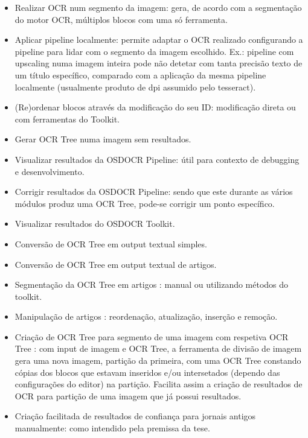 \begin{itemize}
	\item Realizar OCR num segmento da imagem: gera, de acordo com a segmentação do motor OCR, múltiplos blocos com uma só ferramenta.
	
	\item Aplicar pipeline localmente: permite adaptar o OCR realizado configurando a pipeline para lidar com o segmento da imagem escolhido. Ex.: pipeline com upscaling numa imagem inteira pode não detetar com tanta precisão texto de um título específico, comparado com a aplicação da mesma pipeline localmente (usualmente produto de dpi assumido pelo tesseract).
	
	\item (Re)ordenar blocos através da modificação do seu ID: modificação direta ou com ferramentas do Toolkit.
	
	
	\item Gerar OCR Tree numa imagem sem resultados.
	\item Visualizar resultados da OSDOCR Pipeline: útil para contexto de debugging e desenvolvimento.
	
	\item Corrigir resultados da OSDOCR Pipeline: sendo que este durante as vários módulos produz uma OCR Tree, pode-se corrigir um ponto específico.
	\item Visualizar resultados do OSDOCR Toolkit.
	
	\item Conversão de  OCR Tree em output textual simples.
	
	\item Conversão de OCR Tree em output textual de artigos.
	
	\item Segmentação da OCR Tree em artigos : manual ou utilizando métodos do toolkit.
	
	\item Manipulação de artigos : reordenação, atualização, inserção e remoção.
	
	\item Criação de OCR Tree para segmento de uma imagem com respetiva OCR Tree : com input de imagem e OCR Tree, a ferramenta de divisão de imagem gera uma nova imagem, partição da primeira, com uma OCR Tree constando cópias dos blocos que estavam inseridos e/ou intersetados (dependo das configurações do editor) na partição. Facilita assim a criação de resultados de OCR para partição de uma imagem que já possui resultados.
	
	\item Criação facilitada de resultados de confiança para jornais antigos manualmente: como intendido pela premissa da tese.
	

\end{itemize}
